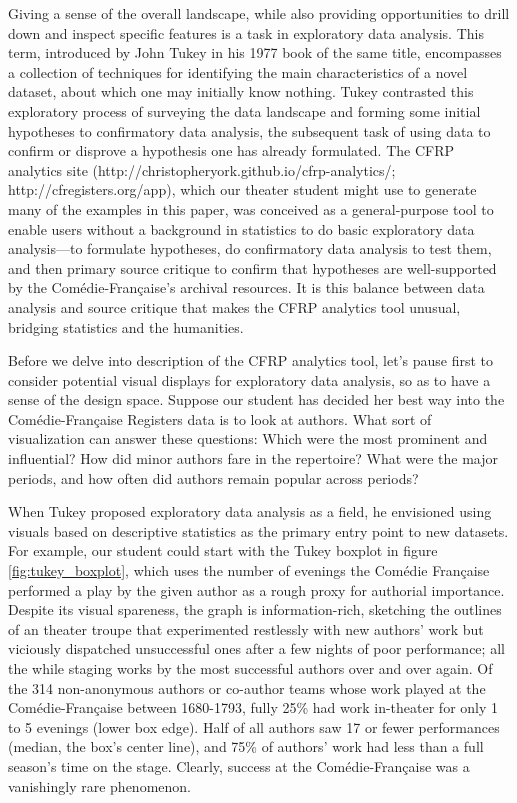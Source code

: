 \documentclass[	DIV=calc,%
							paper=a4,%
							fontsize=11pt,%
							twocolumn]{scrartcl}	 					%
\begin{document}
Giving a sense of the overall landscape, while also providing opportunities to drill down and inspect specific features is a task in exploratory data analysis. This term, introduced by John Tukey in his 1977 book of the same title, encompasses a collection of techniques for identifying the main characteristics of a novel dataset, about which one may initially know nothing.  Tukey contrasted this exploratory process of surveying the data landscape and forming some initial hypotheses to confirmatory data analysis, the subsequent task of using data to confirm or disprove a hypothesis one has already formulated.\cite{TUKEY:1977}  The CFRP analytics site (http://christopheryork.github.io/cfrp-analytics/; http://cfregisters.org/app), which our theater student might use to generate many of the examples in this paper, was conceived as a general-purpose tool to enable users without a background in statistics to do basic exploratory data analysis—to formulate hypotheses, do confirmatory data analysis to test them, and then primary source critique to confirm that hypotheses are well-supported by the Comédie-Française’s archival resources.  It is this balance between data analysis and source critique that makes the CFRP analytics tool unusual, bridging statistics and the humanities.

Before we delve into description of the CFRP analytics tool, let’s pause first to consider potential visual displays for exploratory data analysis, so as to have a sense of the design space. Suppose our student has decided her best way into the Comédie-Française Registers data is to look at authors.  What sort of visualization can answer these questions: Which were the most prominent and influential?  How did minor authors fare in the repertoire?  What were the major periods, and how often did authors remain popular across periods?

When Tukey proposed exploratory data analysis as a field, he envisioned using visuals based on descriptive statistics as the primary entry point to new datasets.  For example, our student could start with the Tukey boxplot in figure \ref{fig:tukey_boxplot}, which uses the number of evenings the Comédie Française performed a play by the given author as a rough proxy for authorial importance.  Despite its visual spareness, the graph is information-rich, sketching the outlines of an theater troupe that experimented restlessly with new authors’ work but viciously dispatched unsuccessful ones after a few nights of poor performance; all the while staging works by the most successful authors over and over again. Of the 314 non-anonymous authors or co-author teams whose work played at the Comédie-Française between 1680-1793, fully 25\% had work in-theater for only 1 to 5 evenings (lower box edge).  Half of all authors saw 17 or fewer performances (median, the box’s center line), and 75\% of authors’ work had less than a full season’s time on the stage.  Clearly, success at the Comédie-Française was a vanishingly rare phenomenon.
\end{document}

